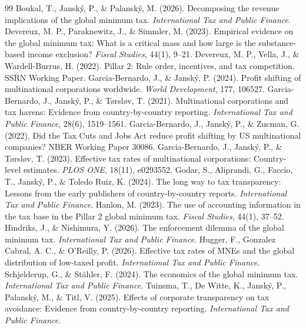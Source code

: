 \documentclass[11pt,a4paper]{article}
\begin{document}
{\footnotesize
\begin{thebibliography}{99}
 Boukal, T., Janský, P., \& Palanský, M. (2026). Decomposing the revenue implications of the global minimum tax. \emph{International Tax and Public Finance}.
 Devereux, M. P., Paraknewitz, J., \& Simmler, M. (2023). Empirical evidence on the global minimum tax: What is a critical mass and how large is the substance-based income exclusion? \emph{Fiscal Studies}, 44(1), 9–21.
 Devereux, M. P., Vella, J., \& Wardell-Burrus, H. (2022). Pillar 2: Rule order, incentives, and tax competition. SSRN Working Paper.
 Garcia-Bernardo, J., \& Janský, P. (2024). Profit shifting of multinational corporations worldwide. \emph{World Development}, 177, 106527.
 Garcia-Bernardo, J., Janský, P., \& T{\o}rsl{\o}v, T. (2021). Multinational corporations and tax havens: Evidence from country-by-country reporting. \emph{International Tax and Public Finance}, 28(6), 1519–1561.
 Garcia-Bernardo, J., Janský, P., \& Zucman, G. (2022). Did the Tax Cuts and Jobs Act reduce profit shifting by US multinational companies? NBER Working Paper 30086.
 Garcia-Bernardo, J., Janský, P., \& T{\o}rsl{\o}v, T. (2023). Effective tax rates of multinational corporations: Country-level estimates. \emph{PLOS ONE}, 18(11), e0293552.
 Godar, S., Aliprandi, G., Faccio, T., Janský, P., \& Toledo Ruiz, K. (2024). The long way to tax transparency: Lessons from the early publishers of country-by-country reports. \emph{International Tax and Public Finance}.
 Hanlon, M. (2023). The use of accounting information in the tax base in the Pillar 2 global minimum tax. \emph{Fiscal Studies}, 44(1), 37–52.
 Hindriks, J., \& Nishimura, Y. (2026). The enforcement dilemma of the global minimum tax. \emph{International Tax and Public Finance}.
 Hugger, F., Gonzalez Cabral, A. C., \& O'Reilly, P. (2026). Effective tax rates of MNEs and the global distribution of low-taxed profit. \emph{International Tax and Public Finance}.
 Schjelderup, G., \& Stähler, F. (2024). The economics of the global minimum tax. \emph{International Tax and Public Finance}.
 Tuinsma, T., De Witte, K., Janský, P., Palanský, M., \& Titl, V. (2025). Effects of corporate transparency on tax avoidance: Evidence from country-by-country reporting. \emph{International Tax and Public Finance}.
\end{thebibliography}}
\end{document}
